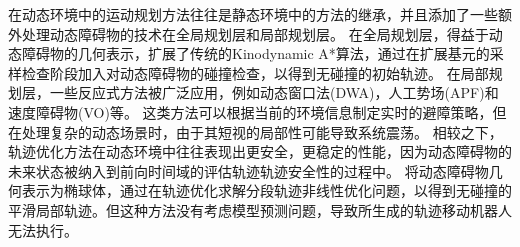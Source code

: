 \documentclass[preprint,5p,times,twocolumn]{elsarticle}
\begin{document}
在动态环境中的运动规划方法往往是静态环境中的方法的继承，并且添加了一些额外处理动态障碍物的技术在全局规划层和局部规划层。
在全局规划层，得益于动态障碍物的几何表示，\citep{wang2021autonomousFI}扩展了传统的Kinodynamic A*算法\citep{Zhou2019RobustAE}，通过在扩展基元的采样检查阶段加入对动态障碍物的碰撞检查，以得到无碰撞的初始轨迹。
在局部规划层，一些反应式方法被广泛应用，例如动态窗口法(DWA)\citep{fox1997TheDW}，人工势场(APF)\citep{khatib1985realTO}和速度障碍物(VO)\citep{fiorini1998MotionPI}等。
这类方法可以根据当前的环境信息制定实时的避障策略，但在处理复杂的动态场景时，由于其短视的局部性可能导致系统震荡。
相较之下，轨迹优化方法在动态环境中往往表现出更安全，更稳定的性能，因为动态障碍物的未来状态被纳入到前向时间域的评估轨迹轨迹安全性的过程中。
\citep{wang2021autonomousFI}将动态障碍物几何表示为椭球体，通过在轨迹优化求解分段轨迹非线性优化问题，以得到无碰撞的平滑局部轨迹。但这种方法没有考虑模型预测问题，导致所生成的轨迹移动机器人无法执行。
\end{document}
